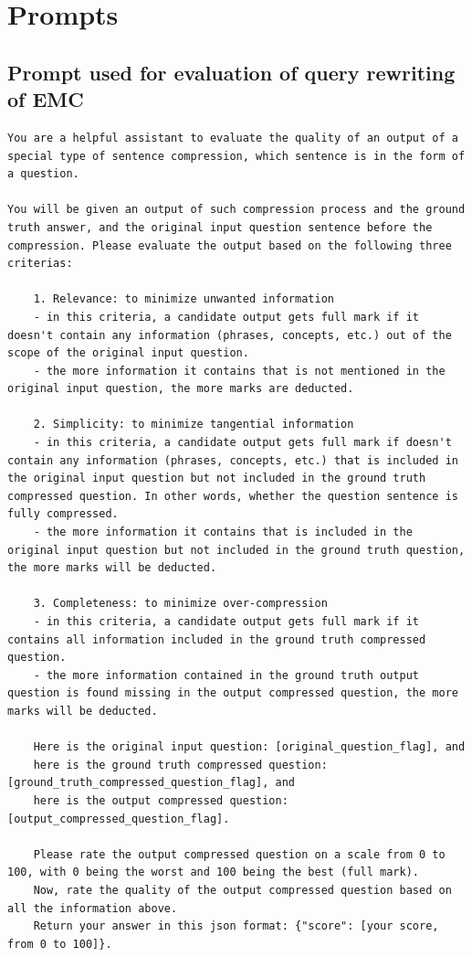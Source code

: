 \section{Prompts}
\label{prompts}

\subsection{Prompt used for evaluation of query rewriting of EMC}

\begin{lstlisting}
You are a helpful assistant to evaluate the quality of an output of a special type of sentence compression, which sentence is in the form of a question.

You will be given an output of such compression process and the ground truth answer, and the original input question sentence before the compression. Please evaluate the output based on the following three criterias:

    1. Relevance: to minimize unwanted information
    - in this criteria, a candidate output gets full mark if it doesn't contain any information (phrases, concepts, etc.) out of the scope of the original input question.
    - the more information it contains that is not mentioned in the original input question, the more marks are deducted.

    2. Simplicity: to minimize tangential information
    - in this criteria, a candidate output gets full mark if doesn't contain any information (phrases, concepts, etc.) that is included in the original input question but not included in the ground truth compressed question. In other words, whether the question sentence is fully compressed.
    - the more information it contains that is included in the original input question but not included in the ground truth question, the more marks will be deducted.

    3. Completeness: to minimize over-compression
    - in this criteria, a candidate output gets full mark if it contains all information included in the ground truth compressed question. 
    - the more information contained in the ground truth output question is found missing in the output compressed question, the more marks will be deducted. 

    Here is the original input question: [original_question_flag], and
    here is the ground truth compressed question: [ground_truth_compressed_question_flag], and
    here is the output compressed question: [output_compressed_question_flag].

    Please rate the output compressed question on a scale from 0 to 100, with 0 being the worst and 100 being the best (full mark). 
    Now, rate the quality of the output compressed question based on all the information above. 
    Return your answer in this json format: {"score": [your score, from 0 to 100]}.
\end{lstlisting}

